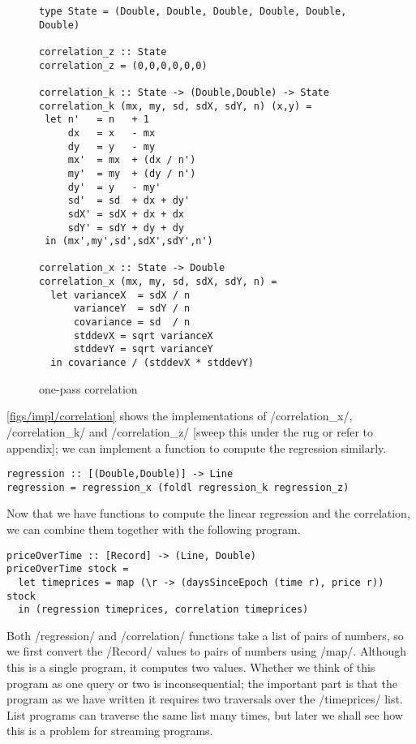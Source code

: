 \begin{figure}
\begin{lstlisting}
type State = (Double, Double, Double, Double, Double, Double)

correlation_z :: State
correlation_z = (0,0,0,0,0,0)

correlation_k :: State -> (Double,Double) -> State
correlation_k (mx, my, sd, sdX, sdY, n) (x,y) =
 let n'   = n   + 1
     dx   = x   - mx
     dy   = y   - my
     mx'  = mx  + (dx / n')
     my'  = my  + (dy / n')
     dy'  = y   - my'
     sd'  = sd  + dx + dy'
     sdX' = sdX + dx + dx
     sdY' = sdY + dy + dy
 in (mx',my',sd',sdX',sdY',n')

correlation_x :: State -> Double
correlation_x (mx, my, sd, sdX, sdY, n) =
  let varianceX  = sdX / n
      varianceY  = sdY / n
      covariance = sd  / n
      stddevX = sqrt varianceX
      stddevY = sqrt varianceY
  in covariance / (stddevX * stddevY)
\end{lstlisting}
\caption[One-pass correlation]{one-pass correlation }
\label{figs/impl/correlation}
\end{figure}

\autoref{figs/impl/correlation} shows the implementations of \Hs/correlation_x/, \Hs/correlation_k/ and \Hs/correlation_z/ [sweep this under the rug or refer to appendix]; we can implement a function to compute the regression similarly.

\begin{lstlisting}
regression :: [(Double,Double)] -> Line
regression = regression_x (foldl regression_k regression_z)
\end{lstlisting}

Now that we have functions to compute the linear regression and the correlation, we can combine them together with the following program.

\begin{lstlisting}
priceOverTime :: [Record] -> (Line, Double)
priceOverTime stock =
  let timeprices = map (\r -> (daysSinceEpoch (time r), price r)) stock
  in (regression timeprices, correlation timeprices)
\end{lstlisting}

Both \Hs/regression/ and \Hs/correlation/ functions take a list of pairs of numbers, so we first convert the \Hs/Record/ values to pairs of numbers using \Hs/map/.
Although this is a single program, it computes two values.
Whether we think of this program as one query or two is inconsequential; the important part is that the program as we have written it requires two traversals over the \Hs/timeprices/ list.
List programs can traverse the same list many times, but later  we shall see how this is a problem for streaming programs.

